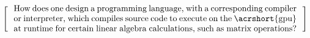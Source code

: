 \[
  \left[
  \begin{minipage}{\textwidth}
  \centering
  \begin{minipage}{0.96\textwidth}
  How does one design a programming language, with a corresponding compiler or interpreter, which compiles source code to execute on the \acrshort{gpu} at runtime for certain linear algebra calculations, such as matrix operations?
  
  



  \end{minipage}
  \end{minipage}
    \right]
\]
